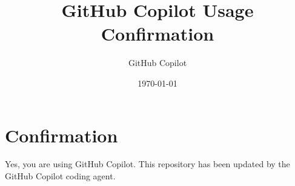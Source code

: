 \documentclass{article}
\title{GitHub Copilot Usage Confirmation}
\author{GitHub Copilot}
\date{\today}
\begin{document}
\maketitle
\section{Confirmation}
Yes, you are using GitHub Copilot. This repository has been updated by the GitHub Copilot coding agent.
\end{document}
